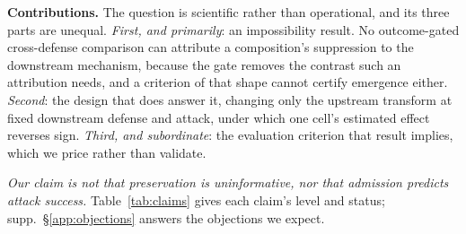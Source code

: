 \documentclass{article}
\begin{document}
\noindent\textbf{Contributions.} The question is scientific rather than operational, and its three parts are unequal. \emph{First, and primarily}: an impossibility result. No outcome-gated cross-defense comparison can attribute a composition's suppression to the downstream mechanism, because the gate removes the contrast such an attribution needs, and a criterion of that shape cannot certify emergence either. \emph{Second}: the design that does answer it, changing only the upstream transform at fixed downstream defense and attack, under which one cell's estimated effect reverses sign. \emph{Third, and subordinate}: the evaluation criterion that result implies, which we price rather than validate.

\noindent \emph{Our claim is not that preservation is uninformative, nor that admission predicts attack success.} Table~\ref{tab:claims} gives each claim's level and status; supp.\ §\ref{app:objections} answers the objections we expect.
\end{document}
